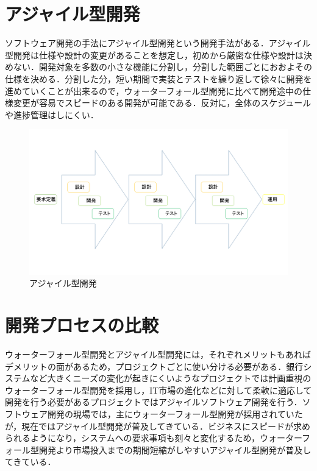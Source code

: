 \newpage

\section{アジャイル型開発}
ソフトウェア開発の手法にアジャイル型開発という開発手法がある．アジャイル型開発は仕様や設計の変更があることを想定し，初めから厳密な仕様や設計は決めない．開発対象を多数の小さな機能に分割し，分割した範囲ごとにおおよその仕様を決める．分割した分，短い期間で実装とテストを繰り返して徐々に開発を進めていくことが出来るので，ウォーターフォール型開発に比べて開発途中の仕様変更が容易でスピードのある開発が可能である．反対に，全体のスケジュールや進捗管理はしにくい\cite{shimizu2012}．

\begin{figure}[htb]
\centering
\includegraphics[width=13cm]{agile.png}
\caption{アジャイル型開発}
\end{figure}

\section{開発プロセスの比較}
ウォーターフォール型開発とアジャイル型開発には，それぞれメリットもあればデメリットの面があるため，プロジェクトごとに使い分ける必要がある．銀行システムなど大きくニーズの変化が起きにくいようなプロジェクトでは計画重視のウォーターフォール型開発を採用し，IT市場の進化などに対して柔軟に適応して開発を行う必要があるプロジェクトではアジャイルソフトウェア開発を行う．ソフトウェア開発の現場では，主にウォーターフォール型開発が採用されていたが，現在ではアジャイル型開発が普及してきている．ビジネスにスピードが求められるようになり，システムへの要求事項も刻々と変化するため，ウォーターフォール型開発より市場投入までの期間短縮がしやすいアジャイル型開発が普及してきている\cite{shimizu2012}．

